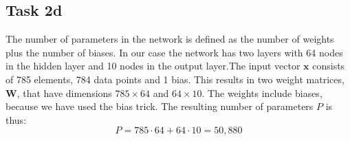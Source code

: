 \documentclass{article}
\begin{document}
\subsection{Task 2d}
The number of parameters in the network is defined as the number of weights plus the number of biases. In our case the network has two layers with 64 nodes in the hidden layer and 10 nodes in the output layer.The input vector $\mathbf{x}$ consists of 785 elements, 784 data points and 1 bias. This results in two weight matrices, $\mathbf{W}$, that have dimensions $785\times64$ and $64\times10$. The weights include biases, because we have used the bias trick. The resulting number of parameters $P$ is thus:
\begin{equation}
    P = 785\cdot64 + 64\cdot 10 = 50,880 
\end{equation}
\end{document}
